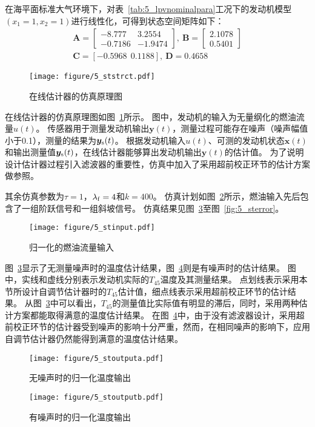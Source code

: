 \documentclass{article}
\begin{document}
在海平面标准大气环境下，对表~\ref{tab:5_lpvnominalpara}工况下的发动机模型$(x_1 = 1, x_2 = 1)$进行线性化，可得到状态空间矩阵如下：
\begin{equation}
\begin{matrix}
\mathbf{A}=
\begin{bmatrix}
-8.777 & 3.2554\\
-0.7186 & -1.9474
\end{bmatrix},\
\mathbf{B}=
\begin{bmatrix}
 2.1078 \\
 0.5401
\end{bmatrix}\\
\mathbf{C} = [-0.5968 \ \  0.1188],\
\mathbf{D} = 0.4658
\end{matrix}
\label{eq:5_stcabcd}
\end{equation}

\begin{figure}[!ht]
    \centering
    \texttt{[image: figure/5\_ststrct.pdf]}
    \caption{在线估计器的仿真原理图}
    \label{fig:5_ststrct}
\end{figure}
在线估计器的仿真原理图如图~\ref{fig:5_ststrct}所示。
图中，发动机的输入为无量纲化的燃油流量$u(t)$。
传感器用于测量发动机输出$\bm{y}(t)$，测量过程可能存在噪声（噪声幅值小于0.1），测量的结果为$\bm{y}_{\rm{s}}(t)$。
根据发动机输入$u(t)$、可测的发动机状态$\bm{x}(t)$和输出测量值$\bm{y}_{\rm{s}}(t)$，在线估计器能够算出发动机输出$\bm{y}(t)$的估计值。
为了说明设计估计器过程引入滤波器的重要性，仿真中加入了采用超前校正环节的估计方案做参照。

其余仿真参数为$\tau = 1$，$\lambda_{\rm{f}} = 4$和$k=400$。
仿真计划如图~\ref{fig:5_stinput}所示，燃油输入先后包含了一组阶跃信号和一组斜坡信号。
仿真结果见图~\ref{fig:5_stoutputa}至图~\ref{fig:5_sterror}。
\begin{figure}[!ht]
    \centering
    \texttt{[image: figure/5\_stinput.pdf]}
    \caption{归一化的燃油流量输入}
    \label{fig:5_stinput}
\end{figure}

图~\ref{fig:5_stoutputa}显示了无测量噪声时的温度估计结果，图~\ref{fig:5_stoutputb}则是有噪声时的估计结果。
图中，实线和虚线分别表示发动机实际的$T_{45}$温度及其测量结果。
点划线表示采用本节所设计自调节估计器时的$T_{45}$估计值，细点线表示采用超前校正环节的估计结果。
从图~\ref{fig:5_stoutputa}中可以看出，$T_{45}$的测量值比实际值有明显的滞后，同时，采用两种估计方案都能取得满意的温度估计结果。
在图~\ref{fig:5_stoutputb}中，由于没有滤波器设计，采用超前校正环节的估计器受到噪声的影响十分严重，然而，在相同噪声的影响下，应用自调节估计器仍然能得到满意的温度估计结果。
\begin{figure}[!ht]
    \centering
    \texttt{[image: figure/5\_stoutputa.pdf]}
    \caption{无噪声时的归一化温度输出}
    \label{fig:5_stoutputa}
\end{figure}
\begin{figure}[!ht]
    \centering
    \texttt{[image: figure/5\_stoutputb.pdf]}
    \caption{有噪声时的归一化温度输出}
    \label{fig:5_stoutputb}
\end{figure}
\end{document}

